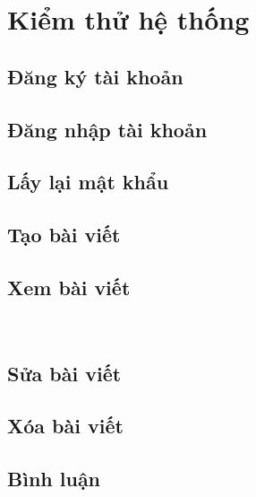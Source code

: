 \documentclass{uetgraduation}
\begin{document}
\section{Kiểm thử hệ thống}

\subsection{Đăng ký tài khoản}


\subsection{Đăng nhập tài khoản}


\subsection{Lấy lại mật khẩu}


\subsection{Tạo bài viết}



\subsection{Xem bài viết}\


\subsection{Sửa bài viết}


\subsection{Xóa bài viết}

\subsection{Bình luận}

\end{document}
